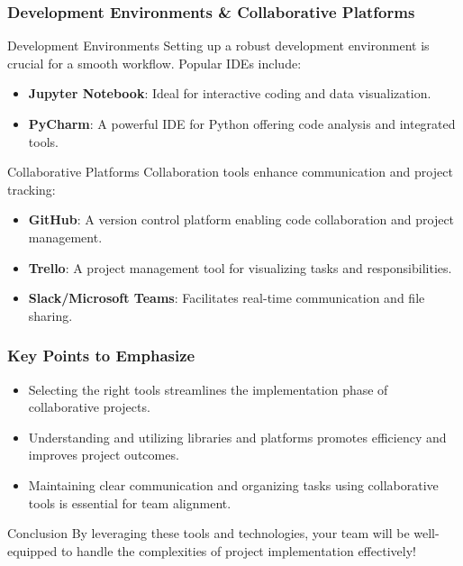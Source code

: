\documentclass[aspectratio=169]{beamer}
\begin{document}
\begin{frame}
    \frametitle{Development Environments \& Collaborative Platforms}
    \begin{block}{Development Environments}
        Setting up a robust development environment is crucial for a smooth workflow. Popular IDEs include:
        \begin{itemize}
            \item \textbf{Jupyter Notebook}: Ideal for interactive coding and data visualization.
            \item \textbf{PyCharm}: A powerful IDE for Python offering code analysis and integrated tools.
        \end{itemize}
    \end{block}

    \begin{block}{Collaborative Platforms}
        Collaboration tools enhance communication and project tracking:
        \begin{itemize}
            \item \textbf{GitHub}: A version control platform enabling code collaboration and project management.
            \item \textbf{Trello}: A project management tool for visualizing tasks and responsibilities.
            \item \textbf{Slack/Microsoft Teams}: Facilitates real-time communication and file sharing.
        \end{itemize}
    \end{block}
\end{frame}

\begin{frame}
    \frametitle{Key Points to Emphasize}
    \begin{itemize}
        \item Selecting the right tools streamlines the implementation phase of collaborative projects.
        \item Understanding and utilizing libraries and platforms promotes efficiency and improves project outcomes.
        \item Maintaining clear communication and organizing tasks using collaborative tools is essential for team alignment.
    \end{itemize}

    \begin{block}{Conclusion}
        By leveraging these tools and technologies, your team will be well-equipped to handle the complexities of project implementation effectively!
    \end{block}
\end{frame}
\end{document}
